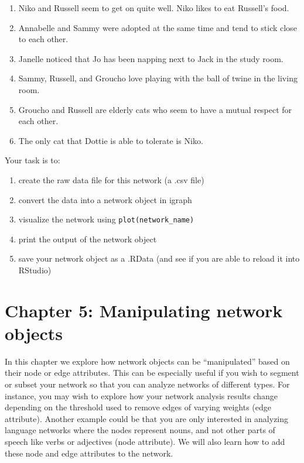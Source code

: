 \documentclass[
]{book}
\providecommand{\tightlist}{%
  \setlength{\itemsep}{0pt}\setlength{\parskip}{0pt}}
\begin{document}
\begin{enumerate}
\def\labelenumi{\arabic{enumi}.}
\tightlist
\item
  Niko and Russell seem to get on quite well. Niko likes to eat Russell's food.
\item
  Annabelle and Sammy were adopted at the same time and tend to stick close to each other.
\item
  Janelle noticed that Jo has been napping next to Jack in the study room.
\item
  Sammy, Russell, and Groucho love playing with the ball of twine in the living room.
\item
  Groucho and Russell are elderly cats who seem to have a mutual respect for each other.
\item
  The only cat that Dottie is able to tolerate is Niko.
\end{enumerate}

Your task is to:

\begin{enumerate}
\def\labelenumi{(\roman{enumi})}
\tightlist
\item
  create the raw data file for this network (a .csv file)
\item
  convert the data into a network object in igraph
\item
  visualize the network using \texttt{plot(network\_name)}
\item
  print the output of the network object
\item
  save your network object as a .RData (and see if you are able to reload it into RStudio)
\end{enumerate}

\chapter{Chapter 5: Manipulating network objects}\label{ch5}

In this chapter we explore how network objects can be ``manipulated'' based on their node or edge attributes. This can be especially useful if you wish to segment or subset your network so that you can analyze networks of different types. For instance, you may wish to explore how your network analysis results change depending on the threshold used to remove edges of varying weights (edge attribute). Another example could be that you are only interested in analyzing language networks where the nodes represent nouns, and not other parts of speech like verbs or adjectives (node attribute). We will also learn how to add these node and edge attributes to the network.
\end{document}
